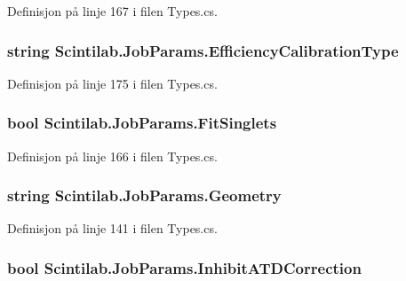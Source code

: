 Definisjon på linje 167 i filen Types.\+cs.

\hypertarget{class_scintilab_1_1_job_params_a45269d4387cc3e0a5bff447ae1e2d5e8}{
\subsubsection[{Efficiency\+Calibration\+Type}]{\setlength{\rightskip}{0pt plus 5cm}string Scintilab.\+Job\+Params.\+Efficiency\+Calibration\+Type}}\label{class_scintilab_1_1_job_params_a45269d4387cc3e0a5bff447ae1e2d5e8}


Definisjon på linje 175 i filen Types.\+cs.

\hypertarget{class_scintilab_1_1_job_params_a771a3ff1807c3d1ce296e5a0f866b40b}{
\subsubsection[{Fit\+Singlets}]{\setlength{\rightskip}{0pt plus 5cm}bool Scintilab.\+Job\+Params.\+Fit\+Singlets}}\label{class_scintilab_1_1_job_params_a771a3ff1807c3d1ce296e5a0f866b40b}


Definisjon på linje 166 i filen Types.\+cs.

\hypertarget{class_scintilab_1_1_job_params_ae52cd6dc9a34a0738e7d40148e11ed45}{
\subsubsection[{Geometry}]{\setlength{\rightskip}{0pt plus 5cm}string Scintilab.\+Job\+Params.\+Geometry}}\label{class_scintilab_1_1_job_params_ae52cd6dc9a34a0738e7d40148e11ed45}


Definisjon på linje 141 i filen Types.\+cs.

\hypertarget{class_scintilab_1_1_job_params_a804db87ae9d00496b0fb4288fad3d76b}{
\subsubsection[{Inhibit\+A\+T\+D\+Correction}]{\setlength{\rightskip}{0pt plus 5cm}bool Scintilab.\+Job\+Params.\+Inhibit\+A\+T\+D\+Correction}}\label{class_scintilab_1_1_job_params_a804db87ae9d00496b0fb4288fad3d76b}


